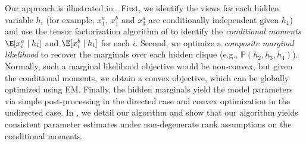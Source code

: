 
Our approach is illustrated in . 
First, we identify the views for each hidden variable $h_i$ (for example,
$x_1^a$, $x_1^b$ and $x_3^a$ are conditionally independent given $h_1$) and use
the tensor factorization algorithm of
\citet{anandkumar12moments,anandkumar13tensor} to identify the \emph{conditional
moments} $\E[x_i^a \mid h_i]$ and $\E[x_i^b \mid h_i]$ for each $i$.
Second, we optimize a \emph{composite marginal likelihood} to recover the marginals over
each hidden clique (e.g., $\mathbb P(h_2, h_3, h_4)$).
Normally, such a marginal likelihood objective would be non-convex,
but given the conditional moments, we obtain a convex objective,
which can be globally optimized using EM.
Finally, the hidden marginals yield the model parameters
via simple post-processing in the directed case and convex optimization in the undirected case.
In , we detail our algorithm and
show that our algorithm yields consistent parameter estimates
under non-degenerate rank assumptions on the conditional moments.

